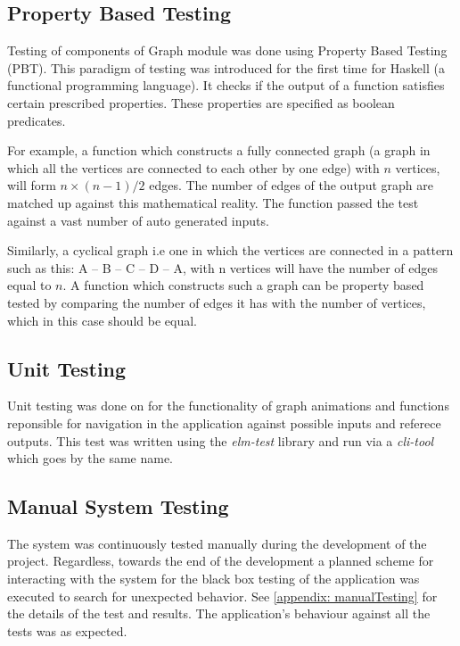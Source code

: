 \subsection{Property Based Testing}
Testing of components of Graph module was done using Property Based Testing (PBT).
This paradigm of testing was introduced for the first time for Haskell (a
functional programming language). It checks if the output of a function
satisfies certain prescribed properties. These properties are specified as
boolean predicates.

For example, a function which constructs a fully connected graph (a graph in
which all the vertices are connected to each other by one edge) with $n$
vertices, will form $n \times (n - 1) / 2$ edges. The number of edges of the output
graph are matched up against this mathematical reality. The function passed
the test against a vast number of auto generated inputs.

Similarly, a cyclical graph i.e one in which the vertices are connected in a
pattern such as this: A -- B -- C -- D -- A, with n vertices will have the
number of edges equal to $n$. A function which constructs such a graph can be
property based tested by comparing the number of edges it has with the number
of vertices, which in this case should be equal.

\subsection{Unit Testing}
Unit testing was done on for the functionality of graph animations and
functions reponsible for navigation in the application against possible inputs
and referece outputs. This test was written using the \emph{elm-test} library
and run via a \emph{cli-tool} which goes by the same name.

\subsection{Manual System Testing}
The system was continuously tested manually during the development of the
project. Regardless, towards the end of the development a planned scheme for
interacting with the system for the black box testing of the application was
executed to search for unexpected behavior. See \autoref{appendix:
manualTesting} for the details of the test and results. The application's
behaviour against all the tests was as expected.
